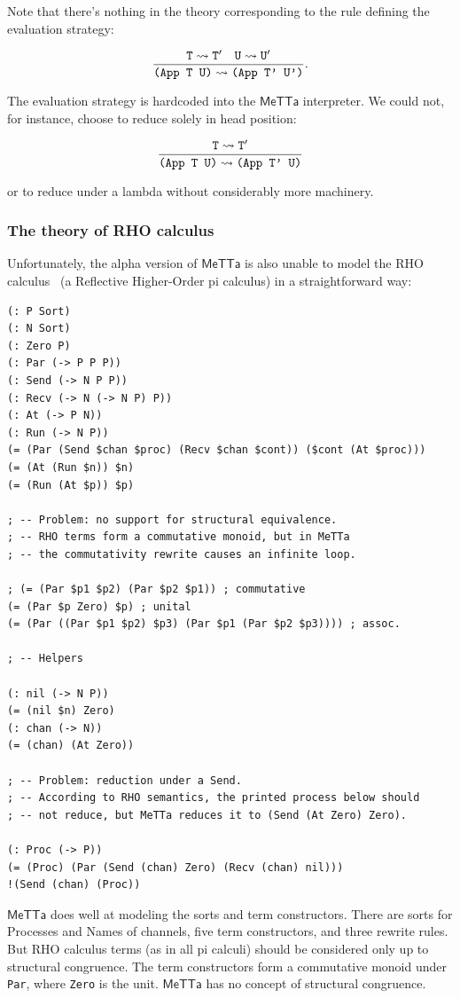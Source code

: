 \documentclass{article}
\begin{document}
Note that there's nothing in the theory corresponding to the rule
defining the evaluation strategy:

\[ \frac{{\tt T} \leadsto {\tt T'} \quad {\tt U} \leadsto {\tt U'}}{\mbox{\tt (App T U)} \leadsto \mbox{\tt (App T' U')}}. \]

The evaluation strategy is hardcoded into the $\mathsf{MeTTa}$
interpreter.  We could not, for instance, choose to reduce solely in
head position:

\[ \frac{{\tt T} \leadsto {\tt T'}}{\mbox{\tt (App T U)} \leadsto \mbox{\tt (App T' U)}} \]

or to reduce under a lambda without considerably more machinery.

\subsubsection{The theory of RHO calculus}

Unfortunately, the alpha version of $\mathsf{MeTTa}$ is also unable
to model the RHO calculus~\cite{MeredithRadestock2005} (a Reflective
Higher-Order pi calculus) in a straightforward way:

\begin{verbatim}
(: P Sort)
(: N Sort)
(: Zero P)
(: Par (-> P P P))
(: Send (-> N P P))
(: Recv (-> N (-> N P) P))
(: At (-> P N))
(: Run (-> N P))
(= (Par (Send $chan $proc) (Recv $chan $cont)) ($cont (At $proc)))
(= (At (Run $n)) $n)
(= (Run (At $p)) $p)

; -- Problem: no support for structural equivalence.
; -- RHO terms form a commutative monoid, but in MeTTa
; -- the commutativity rewrite causes an infinite loop.

; (= (Par $p1 $p2) (Par $p2 $p1)) ; commutative
(= (Par $p Zero) $p) ; unital
(= (Par ((Par $p1 $p2) $p3) (Par $p1 (Par $p2 $p3)))) ; assoc.

; -- Helpers

(: nil (-> N P))
(= (nil $n) Zero)
(: chan (-> N))
(= (chan) (At Zero))

; -- Problem: reduction under a Send.
; -- According to RHO semantics, the printed process below should
; -- not reduce, but MeTTa reduces it to (Send (At Zero) Zero).

(: Proc (-> P))
(= (Proc) (Par (Send (chan) Zero) (Recv (chan) nil)))
!(Send (chan) (Proc))
\end{verbatim}

\noindent $\mathsf{MeTTa}$ does well at modeling the sorts and term
constructors.  There are sorts for Processes and Names of channels,
five term constructors, and three rewrite rules.  But RHO calculus
terms (as in all pi calculi) should be considered only up to
structural congruence.  The term constructors form a commutative
monoid under \verb+Par+, where \verb+Zero+ is the unit.
$\mathsf{MeTTa}$ has no concept of structural congruence.
\end{document}
